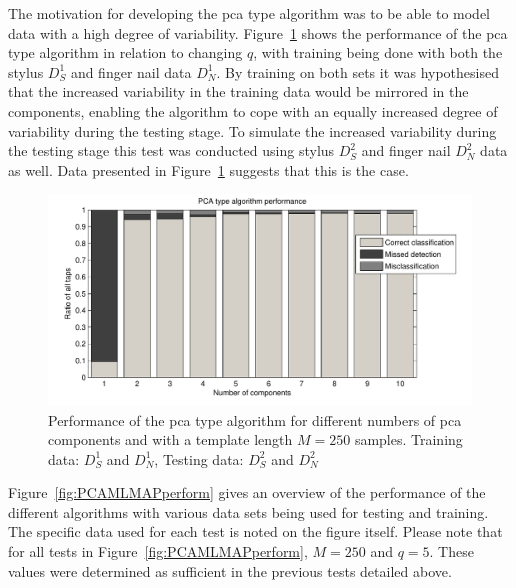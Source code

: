 The motivation for developing the \gls{pca} type algorithm was to be able to model data with a high degree of variability. Figure~\ref{fig:PCAperform_SN-SN} shows the performance of the \gls{pca} type algorithm in relation to changing $q$, with training being done with both the stylus $D^1_S$ and finger nail data $D^1_N$. By training on both sets it was hypothesised that the increased variability in the training data would be mirrored in the components, enabling the algorithm to cope with an equally increased degree of variability during the testing stage. To simulate the increased variability during the testing stage this test was conducted using stylus $D^2_S$ and finger nail $D^2_N$ data as well. Data presented in Figure~\ref{fig:PCAperform_SN-SN} suggests that this is the case.

\begin{figure}[!] %
\centering
\includegraphics[width=150mm]{PCAperform_SN-SN.pdf}
\caption{Performance of the \gls{pca} type algorithm for different numbers of \gls{pca} components and with a template length $M=250$ samples. Training data: $D^1_S$ and $D^1_N$, Testing data: $D^2_S$ and $D^2_N$}\label{fig:PCAperform_SN-SN}
\end{figure}

Figure~\ref{fig:PCAMLMAPperform} gives an overview of the performance of the different algorithms with various data sets being used for testing and training. The specific data used for each test is noted on the figure itself. Please note that for all tests in Figure~\ref{fig:PCAMLMAPperform}, $M=250$ and $q=5$. These values were determined as sufficient in the previous tests detailed above.

